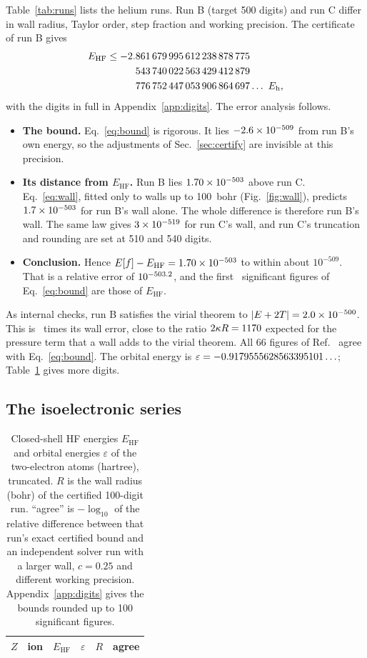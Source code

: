 \documentclass[aps,pra,reprint,superscriptaddress,amsmath,amssymb,longbibliography]{revtex4-2}
\newcommand{\eh}{E_\mathrm{h}}
\newcommand{\EHF}{E_\mathrm{HF}}
\begin{document}
Table~\ref{tab:runs} lists the helium runs. Run B (target 500 digits) and run C differ in wall radius, Taylor order, step fraction and working precision. The certificate of run B gives
\begin{equation}
\begin{split}
\EHF\le{}&\EHFsplit\ldots\ \eh ,
\end{split}\label{eq:bound}
\end{equation}
with the digits in full in Appendix~\ref{app:digits}. The error analysis follows.
\begin{itemize}
\item \textbf{The bound.} Eq.~\eqref{eq:bound} is rigorous. It lies $-2.6\times10^{-509}$ from run B's own energy, so the adjustments of Sec.~\ref{sec:certify} are invisible at this precision.
\item \textbf{Its distance from $\EHF$.} Run B lies $1.70\times10^{-503}$ above run C. Eq.~\eqref{eq:wall}, fitted only to walls up to 100~bohr (Fig.~\ref{fig:wall}), predicts $1.7\times10^{-503}$ for run B's wall alone. The whole difference is therefore run B's wall. The same law gives $3\times10^{-519}$ for run C's wall, and run C's truncation and rounding are set at 510 and 540 digits.
\item \textbf{Conclusion.} Hence $E[f]-\EHF=\gapcert$ to within about $10^{-509}$. That is a relative error of $10^{-503.2}$, and the first \Nsf\ significant figures of Eq.~\eqref{eq:bound} are those of $\EHF$.
\end{itemize}
As internal checks, run B satisfies the virial theorem to $|E+2T|=2.0\times10^{-500}$. This is \virratio\ times its wall error, close to the ratio $2\kappa R=1170$ expected for the pressure term that a wall adds to the virial theorem. All 66 figures of Ref.~\cite{Hatano2025} agree with Eq.~\eqref{eq:bound}. The orbital energy is $\varepsilon=-0.9179555628563395101\ldots$; Table~\ref{tab:series} gives more digits.

\subsection{The isoelectronic series}

\begin{table}[t]
\caption{Closed-shell HF energies $\EHF$ and orbital energies $\varepsilon$ of the two-electron atoms (hartree), truncated. $R$ is the wall radius (bohr) of the certified 100-digit run. ``agree'' is $-\log_{10}$ of the relative difference between that run's exact certified bound and an independent solver run with a larger wall, $c=0.25$ and different working precision. Appendix~\ref{app:digits} gives the bounds rounded up to 100 significant figures.}
\label{tab:series}
\footnotesize
\begin{ruledtabular}
\begin{tabular}{rlllrr}
$Z$ & ion & $\EHF$ & $\varepsilon$ & $R$ & agree \\
\hline

\end{tabular}
\end{ruledtabular}
\end{table}
\end{document}
